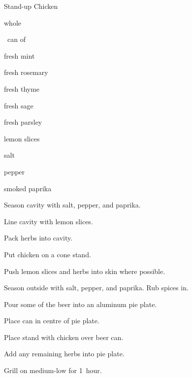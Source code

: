 \begin{recipe}{Stand-up Chicken}{}{}

\begin{ingredients}
\item whole 
\item \half~can of 
\item fresh mint
\item fresh rosemary
\item fresh thyme
\item fresh sage
\item fresh parsley
\item lemon slices
\item salt
\item pepper
\item smoked paprika
\end{ingredients}

\begin{directions}
\item Season cavity with salt, pepper, and paprika.
\item Line cavity with lemon slices.
\item Pack herbs into cavity.
\item Put chicken on a cone stand.
\item Push lemon slices and herbs into skin where possible.
\item Season outside with salt, pepper, and paprika. Rub spices in.
\item Pour some of the beer into an aluminum pie plate.
\item Place can in centre of pie plate.
\item Place stand with chicken over beer can.
\item Add any remaining herbs into pie plate.
\item Grill on medium-low for 1~hour.
\end{directions}

\end{recipe}
